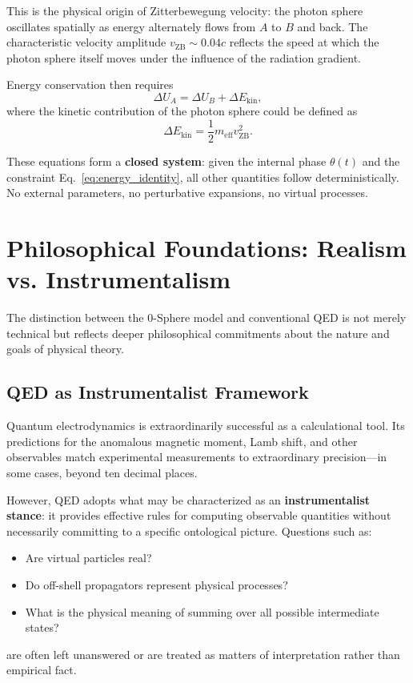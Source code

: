 \documentclass[12pt,letterpaper]{article}
\begin{document}
This is the physical origin of Zitterbewegung velocity: the photon sphere oscillates spatially as energy alternately flows from $A$ to $B$ and back. The characteristic velocity amplitude $v_{\mathrm{ZB}} \sim 0.04c$ reflects the speed at which the photon sphere itself moves under the influence of the radiation gradient.

Energy conservation then requires
\begin{equation}
\Delta U_A = \Delta U_B + \Delta E_{\mathrm{kin}},
\end{equation}
where the kinetic contribution of the photon sphere could be defined as
\begin{equation}
\Delta E_{\mathrm{kin}} = \frac{1}{2} m_{\mathrm{eff}} v_{\mathrm{ZB}}^2 .
\end{equation}

These equations form a \textbf{closed system}: given the internal phase $\theta(t)$ and the constraint Eq.~\eqref{eq:energy_identity}, all other quantities follow deterministically. No external parameters, no perturbative expansions, no virtual processes.


\section{Philosophical Foundations: Realism vs. Instrumentalism}
\label{sec:philosophical}

The distinction between the 0-Sphere model and conventional QED is not merely technical but reflects deeper philosophical commitments about the nature and goals of physical theory.

\subsection{QED as Instrumentalist Framework}

Quantum electrodynamics is extraordinarily successful as a calculational tool. Its predictions for the anomalous magnetic moment, Lamb shift, and other observables match experimental measurements to extraordinary precision—in some cases, beyond ten decimal places.

However, QED adopts what may be characterized as an \textbf{instrumentalist stance}: it provides effective rules for computing observable quantities without necessarily committing to a specific ontological picture. Questions such as:
\begin{itemize}
\item Are virtual particles real?
\item Do off-shell propagators represent physical processes?
\item What is the physical meaning of summing over all possible intermediate states?
\end{itemize}
are often left unanswered or are treated as matters of interpretation rather than empirical fact.
\end{document}
